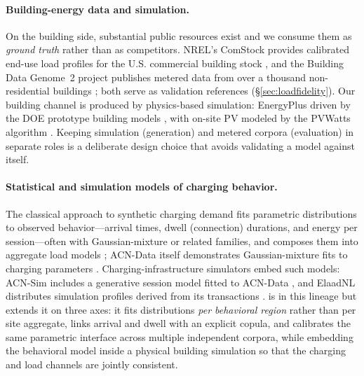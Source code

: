 \paragraph{Building-energy data and simulation.}
On the building side, substantial public resources exist and we consume them
as \emph{ground truth} rather than as competitors. NREL's ComStock provides
calibrated end-use load profiles for the U.S. commercial building stock
\citep{parker2023comstock}, and the Building Data Genome~2 project publishes
metered data from over a thousand non-residential buildings
\citep{miller2020bdg2}; both serve as validation references
(\S\ref{sec:loadfidelity}). Our building channel is produced by physics-based
simulation: EnergyPlus \citep{crawley2001energyplus} driven by the DOE
prototype building models \citep{pnnl_prototypes}, with on-site PV modeled by
the PVWatts algorithm \citep{dobos2014pvwatts}. Keeping simulation
(generation) and metered corpora (evaluation) in separate roles is a
deliberate design choice that avoids validating a model against itself.

\paragraph{Statistical and simulation models of charging behavior.}
The classical approach to synthetic charging demand fits parametric
distributions to observed behavior---arrival times, dwell (connection)
durations, and energy per session---often with Gaussian-mixture or related
families, and composes them into aggregate load models
\citep{xydas2016datadriven,quirostortos2015statistical}; ACN-Data itself
demonstrates Gaussian-mixture fits to charging parameters \citep{lee2019acn}.
Charging-infrastructure simulators embed such models: ACN-Sim includes a
generative session model fitted to ACN-Data \citep{lee2021acnsim}, and
ElaadNL distributes simulation profiles derived from its transactions
\citep{elaadnl2020}. \generator{} is in this lineage but extends it on three
axes: it fits distributions \emph{per behavioral region} rather than
per site aggregate, links arrival and dwell with an explicit copula, and
calibrates the same parametric interface across multiple independent corpora,
while embedding the behavioral model inside a physical building simulation so
that the charging and load channels are jointly consistent.

